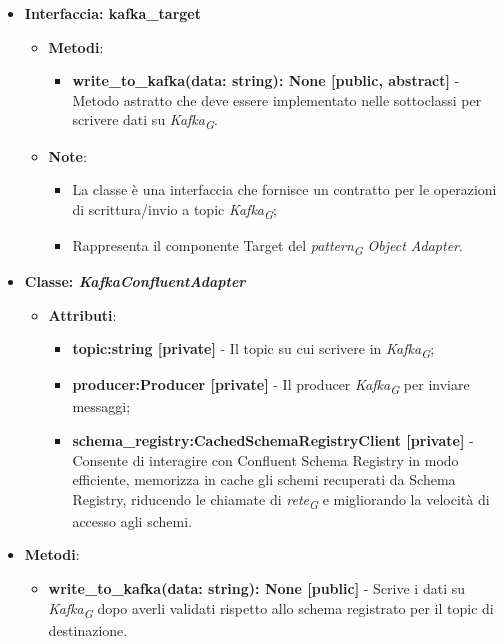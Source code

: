 \begin{itemize}
    \item{\textbf{Interfaccia: kafka\_target}}
    \begin{itemize}
        \item \textbf{Metodi}:
        \begin{itemize}
            \item \textbf{write\_to\_kafka(data: string): None [public, abstract]} - Metodo astratto che deve essere implementato nelle sottoclassi per scrivere dati su \textit{Kafka}\textsubscript{\textit{G}}.
        \end{itemize}
        \item\textbf{Note}:
        \begin{itemize}
            \item La classe è una interfaccia che fornisce un contratto per le operazioni di scrittura/invio a topic \textit{Kafka}\textsubscript{\textit{G}};
            \item Rappresenta il componente Target del \textit{pattern}\textsubscript{\textit{G}} \textit{Object Adapter}.
        \end{itemize}
    \end{itemize}
    \item{\textbf{Classe: \textit{KafkaConfluentAdapter}}}
    \begin{itemize}
        \item\textbf{Attributi}:
        \begin{itemize}
            \item \textbf{topic:string [private]} - Il topic su cui scrivere in \textit{Kafka}\textsubscript{\textit{G}};
            \item \textbf{producer:Producer [private]} - Il producer \textit{Kafka}\textsubscript{\textit{G}} per inviare messaggi;
            \item \textbf{schema\_registry:CachedSchemaRegistryClient [private]} - Consente di interagire con Confluent Schema Registry in modo efficiente, memorizza in cache gli schemi recuperati da Schema Registry, riducendo le chiamate di \textit{rete}\textsubscript{\textit{G}} e migliorando la velocità di accesso agli schemi.
        \end{itemize}
    \end{itemize}
    \item \textbf{Metodi}:
    \begin{itemize}
        \item \textbf{write\_to\_kafka(data: string): None [public]} - Scrive i dati su \textit{Kafka}\textsubscript{\textit{G}} dopo averli validati rispetto allo schema registrato per il topic di destinazione.

\end{itemize}
\end{itemize}
